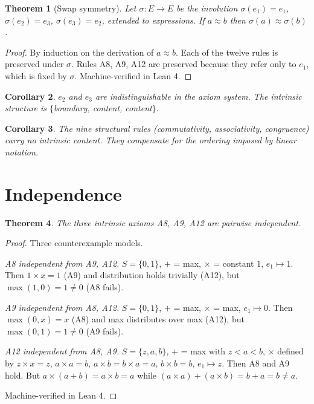 \documentclass[12pt]{article}
\newtheorem{theorem}{Theorem}
\newtheorem{corollary}[theorem]{Corollary}
\begin{document}
\begin{theorem}[Swap symmetry]
\label{thm:swap}
Let $\sigma: E \to E$ be the involution
$\sigma(e_1) = e_1$, $\sigma(e_2) = e_3$,
$\sigma(e_3) = e_2$, extended to expressions.
If $a \approx b$ then $\sigma(a) \approx \sigma(b)$.
\end{theorem}

\begin{proof}
By induction on the derivation of $a \approx b$.
Each of the twelve rules is preserved under $\sigma$.
Rules A8, A9, A12 are preserved because they
refer only to $e_1$, which is fixed by $\sigma$.
Machine-verified in Lean 4.
\end{proof}

\begin{corollary}
$e_2$ and $e_3$ are indistinguishable
in the axiom system.
The intrinsic structure is
$\{$boundary, content, content$\}$.
\end{corollary}

\begin{corollary}
The nine structural rules (commutativity,
associativity, congruence) carry no intrinsic content.
They compensate for the ordering imposed by
linear notation.
\end{corollary}

\section{Independence}

\begin{theorem}
\label{thm:indep}
The three intrinsic axioms A8, A9, A12 are
pairwise independent.
\end{theorem}

\begin{proof}
Three counterexample models.

\emph{A8 independent from A9, A12.}
$S = \{0, 1\}$, $+$ = max, $\times$ = constant $1$,
$e_1 \mapsto 1$.
Then $1 \times x = 1$ (A9) and distribution holds
trivially (A12), but $\max(1, 0) = 1 \neq 0$ (A8 fails).

\emph{A9 independent from A8, A12.}
$S = \{0, 1\}$, $+$ = max, $\times$ = max,
$e_1 \mapsto 0$.
Then $\max(0, x) = x$ (A8) and max distributes
over max (A12), but $\max(0, 1) = 1 \neq 0$ (A9 fails).

\emph{A12 independent from A8, A9.}
$S = \{z, a, b\}$, $+$ = max with $z < a < b$,
$\times$ defined by $z \times x = z$,
$a \times a = b$, $a \times b = b \times a = a$,
$b \times b = b$, $e_1 \mapsto z$.
Then A8 and A9 hold.
But $a \times (a + b) = a \times b = a$ while
$(a \times a) + (a \times b) = b + a = b \neq a$.

Machine-verified in Lean 4.
\end{proof}
\end{document}
